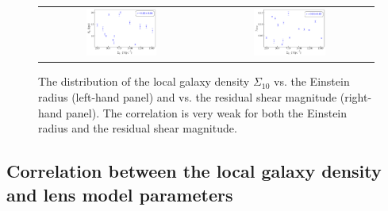 \documentclass{aa}
\newcommand{\newedit}[1]{{#1}} %
\begin{document}
\begin{figure}[htbp]
    \centering
    \begin{tabular}{cc}
        \includegraphics[width=0.45\textwidth]{figures/einstein_radius_vs_Sigma_10A.pdf} & 
        \includegraphics[width=0.45\textwidth]{figures/gamma_shear_vs_Sigma_10A.pdf} \\
    \end{tabular}
    
    \caption{\newedit{The distribution of the local galaxy density $\Sigma_{10}$ vs. the Einstein radius (left-hand panel) and vs. the residual shear magnitude (right-hand panel). The correlation is very weak for both the Einstein radius and the residual shear magnitude.}}
    \label{fig:einstein_radius_gamma_shear_Sigma_10A}
\end{figure}


\subsection{Correlation between the local galaxy density and lens model parameters}
\label{sec:lens_model_params}
\end{document}
